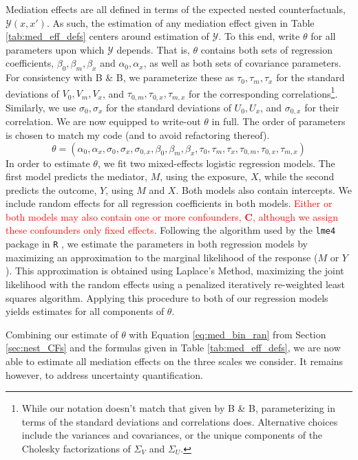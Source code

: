 \documentclass{article}
\newcommand{\sY}{\mathcal{Y}}
\begin{document}
Mediation effects are all defined in terms of the expected nested counterfactuals, $\sY(x, x')$. As such, the estimation of any mediation effect given in Table \ref{tab:med_eff_defs} centers around estimation of $\sY$. To this end, write $\theta$ for all parameters upon which $\sY$ depends. That is, $\theta$ contains both sets of regression coefficients, $\beta_0, \beta_m, \beta_x$ and $\alpha_0, \alpha_x$, as well as both sets of covariance parameters. For consistency with B \& B, we parameterize these as $\tau_0, \tau_m, \tau_x$ for the standard deviations of $V_0, V_m, V_x$, and $\tau_{0,m}, \tau_{0,x}, \tau_{m,x}$ for the corresponding correlations\footnote{While our notation doesn't match that given by B \& B, parameterizing in terms of the standard deviations and correlations does. Alternative choices include the variances and covariances, or the unique components of the Cholesky factorizations of $\Sigma_V$ and $\Sigma_U$.}. Similarly, we use $\sigma_0, \sigma_x$ for the standard deviations of $U_0, U_x$, and $\sigma_{0,x}$ for their correlation. We are now equipped to write-out $\theta$ in full. The order of parameters is chosen to match my code (and to avoid refactoring thereof).
$$
\theta = (\alpha_0, \alpha_x, \sigma_0, \sigma_x, \sigma_{0,x}, \beta_0, \beta_m, \beta_x, \tau_0, \tau_m, \tau_x, \tau_{0,m}, \tau_{0,x}, \tau_{m,x})
$$
%
In order to estimate $\theta$, we fit two mixed-effects logistic regression models. The first model predicts the mediator, $M$, using the exposure, $X$, while the second predicts the outcome, $Y$, using $M$ and $X$. Both models also contain intercepts. We include random effects for all regression coefficients in both models. \textcolor{red}{Either or both models may also contain one or more confounders, $\mathbf{C}$, although we assign these confounders only fixed effects.} Following the algorithm used by the \texttt{lme4} package in \texttt{R} \citep{Bat15, Wal23}, we estimate the parameters in both regression models by maximizing an approximation to the marginal likelihood of the response ($M$ or $Y$). This approximation is obtained using Laplace's Method, maximizing the joint likelihood with the random effects using a penalized iteratively re-weighted least squares algorithm. Applying this procedure to both of our regression models yields estimates for all components of $\theta$.

Combining our estimate of $\theta$ with Equation \ref{eq:med_bin_ran} from Section \ref{sec:nest_CFs} and the formulas given in Table \ref{tab:med_eff_defs}, we are now able to estimate all mediation effects on the three scales we consider. It remains however, to address uncertainty quantification.
\end{document}
